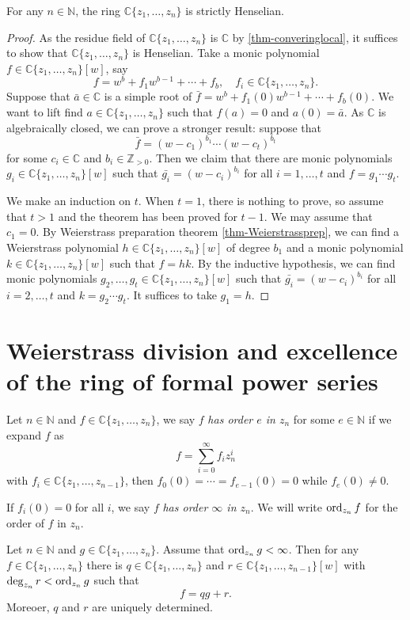 \begin{thm}\label{thm-convpowerstrictHen}
    For any $n\in \mathbb{N}$, the ring $\mathbb{C}\{ z_1,\ldots,z_n \}$ is strictly Henselian.
\end{thm}
\begin{proof}
    As the residue field of $\mathbb{C}\{ z_1,\ldots,z_n \}$ is $\mathbb{C}$ by \cref{thm-converinglocal}, it suffices to show that $\mathbb{C}\{ z_1,\ldots,z_n \}$ is Henselian. Take a monic polynomial $f\in \mathbb{C}\{ z_1,\ldots,z_n \}[w]$, say
    \[
        f=w^b+f_1 w^{b-1}+\cdots+ f_b,\quad f_i\in \mathbb{C}\{ z_1,\ldots,z_n \}.
    \]
    Suppose that $\bar{a}\in \mathbb{C}$ is a simple root of $\bar{f}=w^b+f_1(0)w^{b-1}+\cdots+ f_b(0)$. We want to lift find $a\in \mathbb{C}\{ z_1,\ldots,z_n \}$ such that $f(a)=0$ and $a(0)=\bar{a}$. As $\mathbb{C}$ is algebraically closed, we can prove a stronger result: suppose that 
    \[
        \bar{f}=(w-c_1)^{b_1}\cdots (w-c_t)^{b_t}  
    \]
    for some $c_i\in \mathbb{C}$ and $b_i\in \mathbb{Z}_{>0}$. Then we claim that there are monic polynomials $g_i\in \mathbb{C}\{ z_1,\ldots,z_n \}[w]$ such that $\bar{g_i}=(w-c_i)^{b_i}$ for all $i=1,\ldots,t$ and $f=g_1\cdots g_t$.

    We make an induction on $t$. When $t=1$, there is nothing to prove, so assume that $t>1$ and the theorem has been proved for $t-1$. We may assume that $c_1=0$. By Weierstrass preparation theorem \cref{thm-Weierstrassprep}, we can find a Weierstrass polynomial $h\in \mathbb{C}\{ z_1,\ldots,z_n \}[w]$ of degree $b_1$ and a monic polynomial $k\in \mathbb{C}\{ z_1,\ldots,z_n \}[w]$ such that $f=hk$. By the inductive hypothesis, we can find monic polynomials $g_2,\ldots,g_t\in \mathbb{C}\{ z_1,\ldots,z_n \}[w]$ such that  $\bar{g_i}=(w-c_i)^{b_i}$ for all $i=2,\ldots,t$ and $k=g_2\cdots g_t$. It suffices to take $g_1=h$.
\end{proof}


\section{Weierstrass division and excellence of the ring of formal power series}
\begin{definition}
    Let $n\in \mathbb{N}$ and $f\in \mathbb{C}\{ z_1,\ldots,z_n\}$, we say $f$ \emph{has order $e$ in $z_n$} for some $e\in \mathbb{N}$ if we expand $f$ as
    \[
      f=\sum_{i=0}^{\infty}f_iz_n^i  
    \]
    with $f_i\in \mathbb{C}\{ z_1,\ldots,z_{n-1}\}$, then $f_0(0)=\cdots=f_{e-1}(0)=0$ while $f_e(0)\neq 0$.

    If $f_i(0)=0$ for all $i$, we say $f$ \emph{has order $\infty$ in $z_n$}. We will write $\operatorname{ord}_{z_n}f$ for the order of $f$ in $z_n$.
\end{definition}
\begin{thm}\label{thm-Weierstrassdiv}
    Let $n\in \mathbb{N}$ and $g\in \mathbb{C}\{ z_1,\ldots,z_n\}$. Assume that $\operatorname{ord}_{z_n}g<\infty$. Then for any $f\in \mathbb{C}\{ z_1,\ldots,z_n\}$ there is $q\in \mathbb{C}\{ z_1,\ldots,z_n\}$ and $r\in \mathbb{C}\{ z_1,\ldots,z_{n-1}\}[w]$ with $\deg_{z_n}r<\operatorname{ord}_{z_n}g$ such that
    \[
      f=qg+r.  
    \]
    Moreoer, $q$ and $r$ are uniquely determined.
\end{thm}

